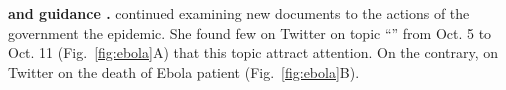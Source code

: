 \noindent \textbf{\normalsize {} and guidance .}
 continued examining new documents to  the actions of the government  the epidemic.
She found few  on Twitter on  topic ``'' from Oct. 5 to Oct. 11 (Fig.~\ref{fig:ebola}A)\kg{,}
 that this topic  attract  attention.
On the contrary,  on Twitter  on the death of  Ebola patient (Fig.~\ref{fig:ebola}B).


